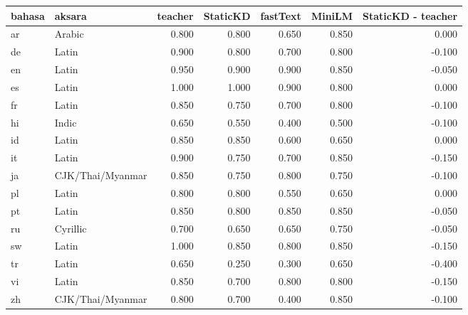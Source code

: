 \begin{tabular}{llrrrrr}
\toprule
bahasa & aksara & teacher & StaticKD & fastText & MiniLM & StaticKD - teacher \\
\midrule
ar & Arabic & 0.800 & 0.800 & 0.650 & 0.850 & 0.000 \\
de & Latin & 0.900 & 0.800 & 0.700 & 0.800 & -0.100 \\
en & Latin & 0.950 & 0.900 & 0.900 & 0.850 & -0.050 \\
es & Latin & 1.000 & 1.000 & 0.900 & 0.800 & 0.000 \\
fr & Latin & 0.850 & 0.750 & 0.700 & 0.800 & -0.100 \\
hi & Indic & 0.650 & 0.550 & 0.400 & 0.500 & -0.100 \\
id & Latin & 0.850 & 0.850 & 0.600 & 0.650 & 0.000 \\
it & Latin & 0.900 & 0.750 & 0.700 & 0.850 & -0.150 \\
ja & CJK/Thai/Myanmar & 0.850 & 0.750 & 0.800 & 0.750 & -0.100 \\
pl & Latin & 0.800 & 0.800 & 0.550 & 0.650 & 0.000 \\
pt & Latin & 0.850 & 0.800 & 0.850 & 0.850 & -0.050 \\
ru & Cyrillic & 0.700 & 0.650 & 0.650 & 0.750 & -0.050 \\
sw & Latin & 1.000 & 0.850 & 0.800 & 0.850 & -0.150 \\
tr & Latin & 0.650 & 0.250 & 0.300 & 0.650 & -0.400 \\
vi & Latin & 0.850 & 0.700 & 0.800 & 0.800 & -0.150 \\
zh & CJK/Thai/Myanmar & 0.800 & 0.700 & 0.400 & 0.850 & -0.100 \\
\bottomrule
\end{tabular}
